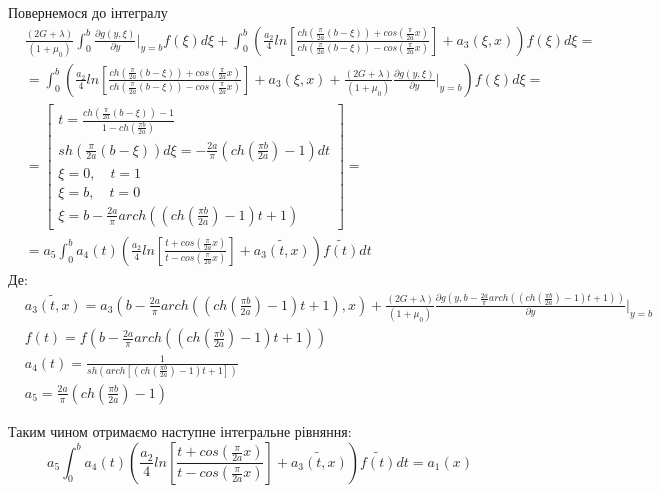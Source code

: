 Повернемося до інтегралу
\begin{align}
    &\frac{(2G + \lambda)}{(1+\mu_0)} \int_{0}^{b}\frac{\partial g(y, \xi)}{\partial y}|_{y=b} f(\xi) d\xi + \int_{0}^{b} \left( \frac{a_2}{4} ln\left[ \frac{ch(\frac{\pi}{2a}(b - \xi)) + cos(\frac{\pi}{2a}x)}{ch(\frac{\pi}{2a}(b - \xi)) - cos(\frac{\pi}{2a}x)} \right] + a_3(\xi, x) \right) f(\xi) d\xi = \\
    & = \int_{0}^{b} \left( \frac{a_2}{4} ln\left[ \frac{ch(\frac{\pi}{2a}(b - \xi)) + cos(\frac{\pi}{2a}x)}{ch(\frac{\pi}{2a}(b - \xi)) - cos(\frac{\pi}{2a}x)} \right] + a_3(\xi, x) + \frac{(2G + \lambda)}{(1+\mu_0)} \frac{\partial g(y, \xi)}{\partial y}|_{y=b} \right) f(\xi) d\xi = \\
    &= \left[
        \begin{matrix}
            t = \frac{ch(\frac{\pi}{2a}(b - \xi)) - 1}{1 - ch(\frac{\pi b}{2a})} \\
            sh(\frac{\pi}{2a}(b - \xi))d\xi = -\frac{2a}{\pi} (ch(\frac{\pi b}{2a}) - 1) dt \\
            \xi = 0, \quad t = 1 \\
            \xi = b, \quad t = 0 \\
            \xi = b - \frac{2a}{\pi} arch((ch(\frac{\pi b}{2a}) - 1)t + 1)
        \end{matrix}
        \right] = \\
    &=a_5 \int_{0}^{b} a_4(t) \left( \frac{a_2}{4} ln\left[ \frac{t + cos(\frac{\pi}{2a}x)}{t - cos(\frac{\pi}{2a}x)} \right] + \widetilde{a_3(t, x)} \right) \widetilde{f(t)} dt
\end{align}
Де:
\begin{align*}
    &\widetilde{a_3(t, x)} = a_3\left(b - \frac{2a}{\pi} arch((ch(\frac{\pi b}{2a}) - 1)t + 1), x \right) + \frac{(2G + \lambda)}{(1+\mu_0)} \frac{\partial g(y, b - \frac{2a}{\pi} arch((ch(\frac{\pi b}{2a}) - 1)t + 1))}{\partial y}|_{y=b} \\
    &f(t) = f(b - \frac{2a}{\pi} arch((ch(\frac{\pi b}{2a}) - 1)t + 1)) \\
    &a_4(t) = \frac{1}{ sh\left(arch\left[ (ch(\frac{\pi b}{2a}) - 1)t + 1 \right]\right) } \\
    &a_5 = \frac{2a}{\pi} (ch(\frac{\pi b}{2a}) - 1)
\end{align*}

Таким чином отримаємо наступне інтегральне рівняння:
\begin{equation}
    a_5 \int_{0}^{b} a_4(t) \left( \frac{a_2}{4} ln\left[ \frac{t + cos(\frac{\pi}{2a}x)}{t - cos(\frac{\pi}{2a}x)} \right] + \widetilde{a_3(t, x)} \right) \widetilde{f(t)} dt = a_1(x)
\end{equation}


